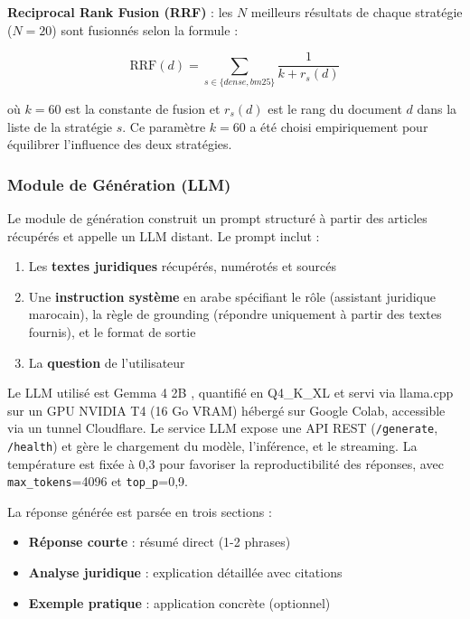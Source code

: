 \textbf{Reciprocal Rank Fusion (RRF)} : les $N$ meilleurs résultats de chaque
stratégie ($N = 20$) sont fusionnés selon la formule :

\[
\text{RRF}(d) = \sum_{s \in \{dense, bm25\}} \frac{1}{k + r_s(d)}
\]

où $k = 60$ est la constante de fusion et $r_s(d)$ est le rang du document
$d$ dans la liste de la stratégie $s$. Ce paramètre $k = 60$ a été choisi
empiriquement pour équilibrer l'influence des deux stratégies.

\subsubsection{Module de Génération (LLM)}

Le module de génération \cite{src:generation} construit un prompt structuré
à partir des articles récupérés et appelle un LLM distant. Le prompt inclut :

\begin{enumerate}
    \item Les \textbf{textes juridiques} récupérés, numérotés et sourcés
    \item Une \textbf{instruction système} en arabe spécifiant le rôle
    (assistant juridique marocain), la règle de grounding (répondre
    uniquement à partir des textes fournis), et le format de sortie
    \item La \textbf{question} de l'utilisateur
\end{enumerate}

Le LLM utilisé est Gemma 4 2B \cite{google2025gemma4}, quantifié en
Q4\_K\_XL et servi via llama.cpp \cite{gerganov2023llamacpp} sur un GPU
NVIDIA T4 (16 Go VRAM) hébergé sur Google Colab, accessible via un tunnel
Cloudflare. Le service LLM expose une API REST (\texttt{/generate},
\texttt{/health}) et gère le chargement du modèle, l'inférence, et le
streaming. La température est fixée à 0,3 pour favoriser la reproductibilité
des réponses, avec \texttt{max\_tokens}=4096 et \texttt{top\_p}=0,9.

La réponse générée est parsée en trois sections :
\begin{itemize}
    \item \textbf{Réponse courte} : résumé direct (1-2 phrases)
    \item \textbf{Analyse juridique} : explication détaillée avec citations
    \item \textbf{Exemple pratique} : application concrète (optionnel)
\end{itemize}

